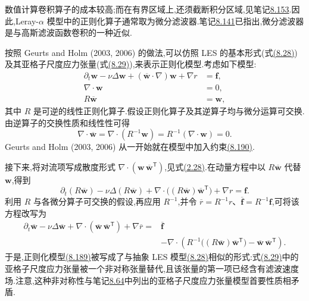 \begin{note}[正则化算子]
\label{note:leray-alpha-regularization-operator}
数值计算卷积算子的成本较高;而在有界区域上,还须截断积分区域,见笔记\hyperref[note:les-differential-filter-boundary-conditions]{8.153}.因此,Leray-$\alpha$ 模型中的正则化算子通常取为微分滤波器.笔记\hyperref[note:les-differential-filter-convolution-approximation]{8.141}已指出,微分滤波器是与高斯滤波函数卷积的一种近似.
\end{note}

\begin{note}[将抽象正则化方程改写为大尺度方程]
\label{note:leray-alpha-abstract-regularized-equation}
按照 Geurts and Holm (2003, 2006) 的做法,可以仿照 LES 的基本形式(式\hyperref[eq:space-averaged-navier-stokes-full-space]{(8.28)})及其亚格子尺度应力张量(式\hyperref[eq:subgrid-stress-decomposition]{(8.29)}),来表示正则化模型.考虑如下模型:
\begin{equation}\label{eq:leray-alpha-abstract-model}
\begin{aligned}
 \partial_t\bm{w}-\nu\Delta\bm{w}
  +(\overline{\bm{w}}\cdot\nabla)\bm{w}
  +\nabla r&=\bm{f},\\
 \nabla\cdot\bm{w}&=0,\\
 R\overline{\bm{w}}&=\bm{w},
\end{aligned}
\end{equation}
其中 $R$ 是可逆的线性正则化算子.假设正则化算子及其逆算子均与微分运算可交换.由逆算子的交换性质和线性性可得
\begin{equation}\label{eq:leray-alpha-regularized-divergence}
 \nabla\cdot\overline{\bm{w}}
 =\nabla\cdot(R^{-1}\bm{w})
 =R^{-1}(\nabla\cdot\bm{w})=0.
\end{equation}
Geurts and Holm (2003, 2006) 从一开始就在模型中加入约束\hyperref[eq:leray-alpha-regularized-divergence]{(8.190)}.

接下来,将对流项写成散度形式 $\nabla\cdot(\bm{w}\,\overline{\bm{w}}^{\mathsf T})$,见式\hyperref[eq:convective-divergence-form]{(2.28)}.在动量方程中以 $R\overline{\bm{w}}$ 代替 $\bm{w}$,得到
\[
 \partial_t(R\overline{\bm{w}})
 -\nu\Delta(R\overline{\bm{w}})
 +\nabla\cdot\bigl((R\overline{\bm{w}})
       \overline{\bm{w}}^{\mathsf T}\bigr)
 +\nabla r=\bm{f}.
\]
利用 $R$ 与各微分算子可交换的假设,再应用 $R^{-1}$,并令
$\overline r=R^{-1}r$、$\overline{\bm{f}}=R^{-1}\bm{f}$,可将该方程改写为
\[
\begin{aligned}
 \partial_t\overline{\bm{w}}
 -\nu\Delta\overline{\bm{w}}
 +\nabla\cdot(\overline{\bm{w}}\,\overline{\bm{w}}^{\mathsf T})
 +\nabla\overline r
 ={}&\overline{\bm{f}}\\
 &-\nabla\cdot\left(
 R^{-1}\bigl((R\overline{\bm{w}})
              \overline{\bm{w}}^{\mathsf T}\bigr)
 -\overline{\bm{w}}\,\overline{\bm{w}}^{\mathsf T}
 \right).
\end{aligned}
\]
于是,正则化模型\hyperref[eq:leray-alpha-abstract-model]{(8.189)}被写成了与抽象 LES 模型\hyperref[eq:space-averaged-navier-stokes-full-space]{(8.28)}相似的形式:式\hyperref[eq:subgrid-stress-decomposition]{(8.29)}中的亚格子尺度应力张量被一个非对称张量替代,且该张量的第一项已经含有滤波速度场.注意,这种非对称性与笔记\hyperref[note:sgs-stress-properties]{8.64}中列出的亚格子尺度应力张量模型首要性质相矛盾.
\end{note}

